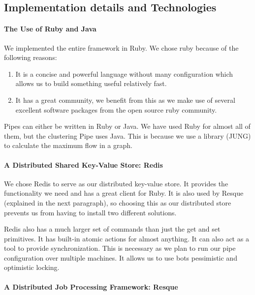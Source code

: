 \subsection{Implementation details and Technologies}

\paragraph{The Use of Ruby and Java}

We implemented the entire framework in Ruby. We chose ruby because of the following reasons:

\begin{enumerate}
\item It is a concise and powerful language without many configuration which allows us to build something useful relatively fast.
\item It has a great community, we benefit from this as we make use of several excellent software packages from the open source ruby community.
\end{enumerate}

Pipes can either be written in Ruby or Java. We have used Ruby for almost all of them, but the clustering Pipe uses Java. This is because we use a library (JUNG) to calculate the maximum flow in a graph.

\paragraph{A Distributed Shared Key-Value Store: Redis}

We chose Redis to serve as our distributed key-value store. It provides the functionality we need and has a great client for Ruby. It is also used by Resque (explained in the next paragraph), so choosing this as our distributed store prevents us from having to install two different solutions.

Redis also has a much larger set of commands than just the get and set primitives. It has built-in atomic actions for almost anything. It can also act as a tool to provide synchronization. This is necessary as we plan to run our pipe configuration over multiple machines. It allows us to use bots pessimistic and optimistic locking.

\paragraph{A Distributed Job Processing Framework: Resque}

